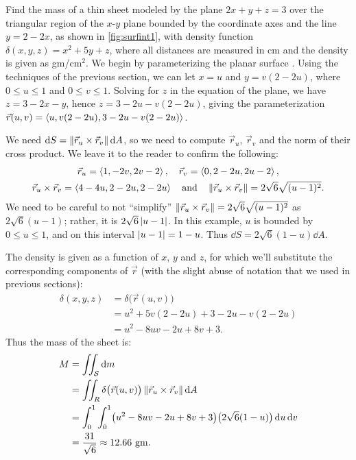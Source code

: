 \begin{example}\label{ex_surfint1}%
Find the mass of a thin sheet modeled by the plane $2x+y+z=3$ over the triangular region of the $x$-$y$ plane bounded by the coordinate axes and the line $y=2-2x$, as shown in \autoref{fig:surfint1}, with density function $\delta(x,y,z) = x^2+5y+z$, where all distances are measured in cm and the density is given as gm/cm$^2$.
\solution
We begin by parameterizing the planar surface \surfaceS. Using the techniques of the previous section, we can let $x=u$ and $y=v(2-2u)$, where $0\leq u\leq 1$ and $0\leq v\leq 1$. Solving for $z$ in the equation of the plane, we have $z=3-2x-y$, hence $z = 3-2u-v(2-2u)$, giving the parameterization
$\vec r(u,v) =\left\langle u, v(2-2u), 3-2u-v(2-2u)\right\rangle$.

We need $\operatorname{d}\! S=\left\lVert \vec r_u\times \vec r_v \right\rVert\operatorname{d}\! A$, so we need to compute $\vec r_u$, $\vec r_v$ and the norm of their cross product. We leave it to the reader to confirm the following:
\begin{gather*}
\vec r_u =\left\langle 1,-2v,2v-2\right\rangle,\quad \vec r_v =\left\langle 0,2-2u, 2u-2\right\rangle,\\
\vec r_u\times \vec r_v =\left\langle 4-4u,2-2u,2-2u\right\rangle
\quad \text{and}\quad
\left\lVert \vec r_u\times \vec r_v \right\rVert = 2\sqrt{6}\sqrt{(u-1)^2}.
\end{gather*}
We need to be careful to not ``simplify'' $\left\lVert \vec r_u\times \vec r_v \right\rVert = 2\sqrt{6}\sqrt{(u-1)^2}$ as $2\sqrt{6}(u-1)$; rather, it is $2\sqrt{6}\left\lvert u-1 \right\rvert$. In this example, $u$ is bounded by $0\leq u\leq 1$, and on this interval $\left\lvert u-1 \right\rvert= 1-u$. Thus $\dd S = 2\sqrt{6}(1-u)\dd A$. 

The density is given as a function of $x$, $y$ and $z$, for which we'll substitute the corresponding components of $\vec r$ (with the slight abuse of notation that we used in previous sections): 
\begin{align*}
	\delta(x,y,z)
	&= \delta\bigl(\vec r(u,v)\bigr) \\
	&= u^2 + 5v(2-2u)+3-2u-v(2-2u)\\
	&= u^2-8uv-2u+8v+3.
\end{align*}
Thus the mass of the sheet is:
\begin{align*}
	M &= \iint_{\mathcal{S}}\operatorname{d}\! m\\
	&= \iint_R \delta\bigl(\vec r(u,v)\bigr)\left\lVert \vec r_u\times \vec r_v \right\rVert\operatorname{d}\! A\\
	&= \int_0^1\int_0^1 \bigl(u^2-8uv-2u+8v+3\bigr)\bigl(2\sqrt{6}(1-u)\bigr)\operatorname{d}\! u\operatorname{d}\! v\\
	&= \frac{31}{\sqrt{6}} \approx 12.66 \text{ gm.}
\end{align*}
\end{example}

